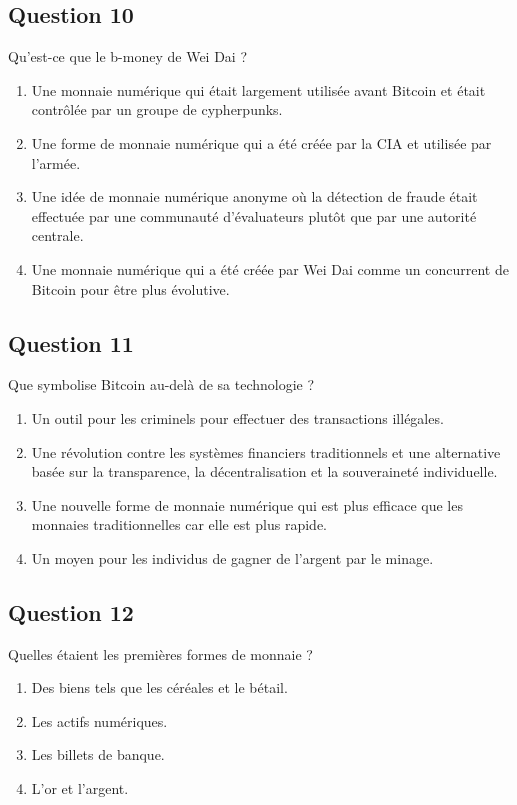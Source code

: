 \documentclass[12pt,a4paper]{article}
\begin{document}
\bigskip


\subsection*{Question 10}
Qu'est-ce que le b-money de Wei Dai ?

\begin{enumerate}[label=\Alph*., leftmargin=*]
\item Une monnaie numérique qui était largement utilisée avant Bitcoin et était contrôlée par un groupe de cypherpunks.
\item Une forme de monnaie numérique qui a été créée par la CIA et utilisée par l'armée.
\item Une idée de monnaie numérique anonyme où la détection de fraude était effectuée par une communauté d'évaluateurs plutôt que par une autorité centrale.
\item Une monnaie numérique qui a été créée par Wei Dai comme un concurrent de Bitcoin pour être plus évolutive.
\end{enumerate}

\bigskip


\subsection*{Question 11}
Que symbolise Bitcoin au-delà de sa technologie ?

\begin{enumerate}[label=\Alph*., leftmargin=*]
\item Un outil pour les criminels pour effectuer des transactions illégales.
\item Une révolution contre les systèmes financiers traditionnels et une alternative basée sur la transparence, la décentralisation et la souveraineté individuelle.
\item Une nouvelle forme de monnaie numérique qui est plus efficace que les monnaies traditionnelles car elle est plus rapide.
\item Un moyen pour les individus de gagner de l'argent par le minage.
\end{enumerate}

\bigskip


\subsection*{Question 12}
Quelles étaient les premières formes de monnaie ?

\begin{enumerate}[label=\Alph*., leftmargin=*]
\item Des biens tels que les céréales et le bétail.
\item Les actifs numériques.
\item Les billets de banque.
\item L'or et l'argent.
\end{enumerate}
\end{document}
